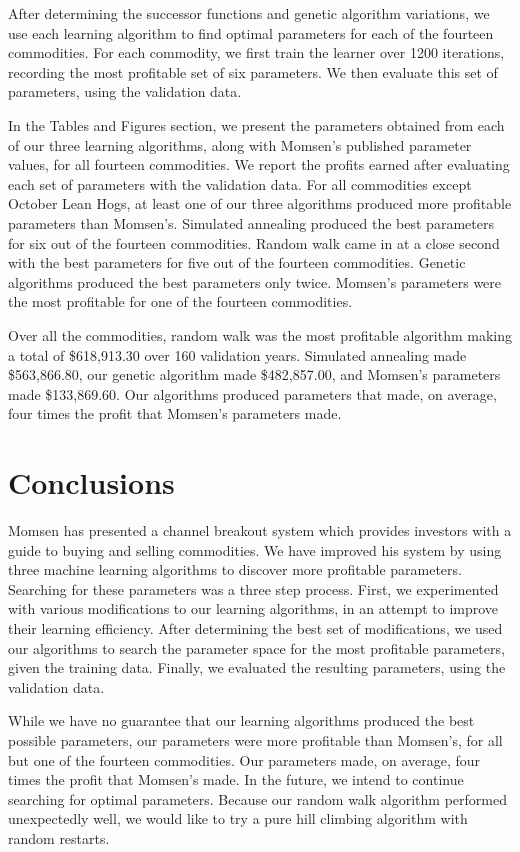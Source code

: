 \documentclass[12pt]{article}
\begin{document}
After determining the successor functions and genetic algorithm variations, we
use each learning algorithm to find optimal parameters for each of the fourteen
commodities. For each commodity, we first train the learner over 1200
iterations, recording the most profitable set of six parameters. We then
evaluate this set of parameters, using the validation data.

In the Tables and Figures section, we present the parameters obtained from each
of our three learning algorithms, along with Momsen's published parameter
values, for all fourteen commodities. We report the profits earned after
evaluating each set of parameters with the validation data.  For all commodities
except October Lean Hogs, at least one of our three algorithms produced more
profitable parameters than Momsen's. Simulated annealing produced the best
parameters for six out of the fourteen commodities.  Random walk came in at a
close second with the best parameters for five out of the fourteen commodities.
Genetic algorithms produced the best parameters only twice.  Momsen's parameters
were the most profitable for one of the fourteen commodities.

Over all the commodities, random walk was the most profitable algorithm making a
total of \$618,913.30 over 160 validation years.  Simulated annealing made
\$563,866.80, our genetic algorithm made \$482,857.00, and Momsen's parameters
made \$133,869.60. Our algorithms produced parameters that made, on average,
four times the profit that Momsen's parameters made.

\section{Conclusions}

Momsen has presented a channel breakout system which provides investors with a
guide to buying and selling commodities.  We have improved his system by using
three machine learning algorithms to discover more profitable
parameters. Searching for these parameters was a three step process. First, we
experimented with various modifications to our learning algorithms, in an
attempt to improve their learning efficiency. After determining the best set of
modifications, we used our algorithms to search the parameter space for the most
profitable parameters, given the training data. Finally, we evaluated the
resulting parameters, using the validation data.

While we have no guarantee that our learning algorithms produced the best
possible parameters, our parameters were more profitable than Momsen's, for all
but one of the fourteen commodities.  Our parameters made, on average, four
times the profit that Momsen's made.  In the future, we intend to continue
searching for optimal parameters.  Because our random walk algorithm performed
unexpectedly well, we would like to try a pure hill climbing algorithm with
random restarts.
\end{document}
